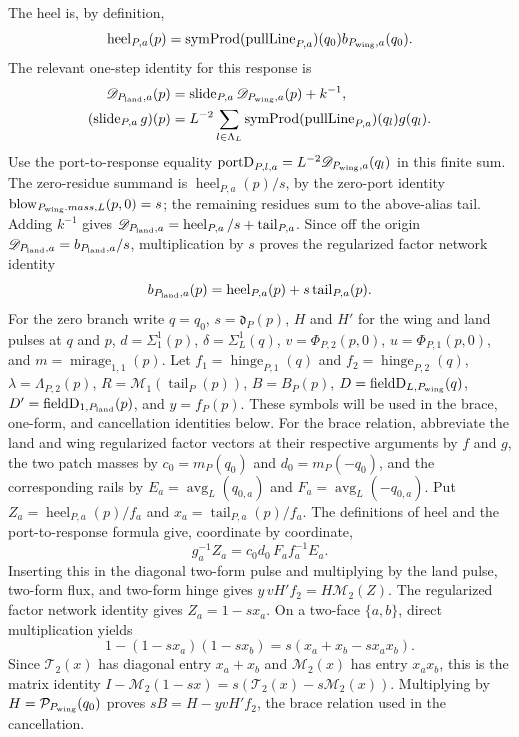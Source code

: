 The heel is, by definition,
\[
 \operatorname{heel}_{P,a}(p)=
   \operatorname{symProd}(\operatorname{pullLine}_{P,a})(q_0)
       b_{P_{\rm wing},a}(q_0).
\]
The relevant one-step identity for this response is
\[\begin{aligned}
 \mathscr D_{P_{\rm land},a}(p)&=\operatorname{slide}_{P,a}
      \mathscr D_{P_{\rm wing},a}(p)+k^{-1},\,\\
 (\operatorname{slide}_{P,a}g)(p)&=L^{-2}\sum_{l\in\Lambda_L}
      \operatorname{symProd}(\operatorname{pullLine}_{P,a})(q_l)g(q_l).
\end{aligned}\]
Use the port-to-response equality
$\operatorname{portD}_{P,l,a}=L^{-2}\mathscr D_{P_{\rm wing},a}(q_l)$
in this finite sum. The zero-residue summand is
$\operatorname{heel}_{P,a}(p)/s$, by the zero-port identity
$\operatorname{blow}_{P_{\rm wing}.mass,L}(p,0)=s$; the remaining
residues sum to the above-alias tail. Adding $k^{-1}$ gives
$\mathscr D_{P_{\rm land},a}=\operatorname{heel}_{P,a}/s+
\operatorname{tail}_{P,a}$. Since off the origin
$\mathscr D_{P_{\rm land},a}=b_{P_{\rm land},a}/s$, multiplication by $s$
proves the regularized factor network identity
\[
 b_{P_{\rm land},a}(p)=\operatorname{heel}_{P,a}(p)+
             s\operatorname{tail}_{P,a}(p).
\]
For the zero branch write $q=q_0$, $s=\mathfrak d_P(p)$, $H$ and $H'$
for the wing and land pulses at $q$ and $p$, $d=\Sigma_1^1(p)$,
$\delta=\Sigma_L^1(q)$, $v=\Phi_{P,2}(p,0)$,
$u=\Phi_{P,1}(p,0)$, and $m=\operatorname{mirage}_{1,1}(p)$.
Let $f_1=\operatorname{hinge}_{P,1}(q)$ and
$f_2=\operatorname{hinge}_{P,2}(q)$, $\lambda=\Lambda_{P,2}(p)$,
$R=\mathcal M_1(\operatorname{tail}_P(p))$, $B=B_P(p)$,
$D=\operatorname{fieldD}_{L,P_{\rm wing}}(q)$,
$D'=\operatorname{fieldD}_{1,P_{\rm land}}(p)$, and
$y=f_P(p)$. These symbols will be used in the brace,
one-form, and cancellation identities below.
For the brace relation, abbreviate the land and wing regularized factor vectors at their
respective arguments by $f$ and $g$, the two patch masses by
$c_0=m_P(q_0)$ and $d_0=m_P(-q_0)$, and the corresponding rails by
$E_a=\operatorname{avg}_L(q_{0,a})$ and
$F_a=\operatorname{avg}_L(-q_{0,a})$. Put
$Z_a=\operatorname{heel}_{P,a}(p)/f_a$ and
$x_a=\operatorname{tail}_{P,a}(p)/f_a$. The definitions of heel and the
port-to-response formula give, coordinate by coordinate,
\[
 g_a^{-1}Z_a=c_0d_0\,F_a f_a^{-1}E_a.
\]
Inserting this in the diagonal two-form pulse and multiplying by the land
pulse, two-form flux, and two-form hinge gives
$y\,vH'f_2=H\mathcal M_2(Z)$. The regularized factor network identity gives
$Z_a=1-sx_a$. On a two-face $\{a,b\}$, direct multiplication yields
\[
 1-(1-sx_a)(1-sx_b)=s(x_a+x_b-sx_ax_b).
\]
Since $\mathcal T_2(x)$ has diagonal entry $x_a+x_b$ and
$\mathcal M_2(x)$ has entry $x_ax_b$, this is the matrix identity
$I-\mathcal M_2(1-sx)=s(\mathcal T_2(x)-s\mathcal M_2(x))$.
Multiplying by $H=\mathcal P_{P_{\rm wing}}(q_0)$ proves
$sB=H-yvH'f_2$, the brace relation used in the cancellation.

